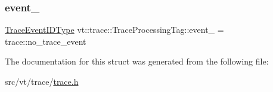 \subsubsection{\texorpdfstring{event\+\_\+}{event\_}}
{\footnotesize\ttfamily \hyperlink{namespacevt_1_1trace_a64a7185f3e102df8d8258f263ccd1582}{Trace\+Event\+I\+D\+Type} vt\+::trace\+::\+Trace\+Processing\+Tag\+::event\+\_\+ = trace\+::no\+\_\+trace\+\_\+event\hspace{0.3cm}{\ttfamily [private]}}



The documentation for this struct was generated from the following file\+:\begin{DoxyCompactItemize}
\item 
src/vt/trace/\hyperlink{trace_8h}{trace.\+h}\end{DoxyCompactItemize}
